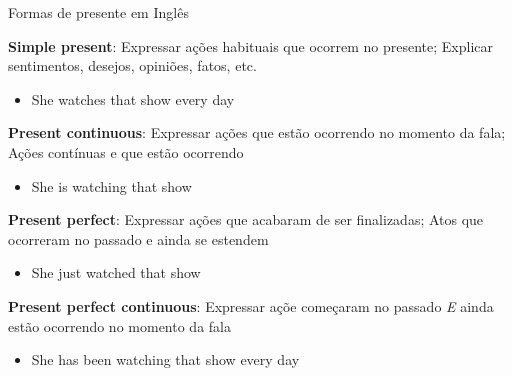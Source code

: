 \documentclass[compress,mathserif,xcolor=table]{beamer}
\begin{document}
\begin{frame}{Formas de presente em Inglês}

\textbf{Simple present}: Expressar ações habituais que ocorrem no presente; Explicar sentimentos, desejos, opiniões, fatos, etc.
\begin{itemize}
    \item She watches that show every day
\end{itemize}

\vspace{0.25cm}

\textbf{Present continuous}: Expressar ações que estão ocorrendo no momento da fala; Ações contínuas e que estão ocorrendo
\begin{itemize}
    \item She is watching that show
\end{itemize}

\vspace{0.25cm}

\textbf{Present perfect}: Expressar ações que acabaram de ser finalizadas; Atos que ocorreram no passado e ainda se estendem
\begin{itemize}
    \item She just watched that show
\end{itemize}

\vspace{0.25cm}

\textbf{Present perfect continuous}: Expressar açõe começaram no passado \textit{E} ainda estão ocorrendo no momento da fala
\begin{itemize}
    \item She has been watching that show every day
\end{itemize}

\end{frame}

\end{document}
